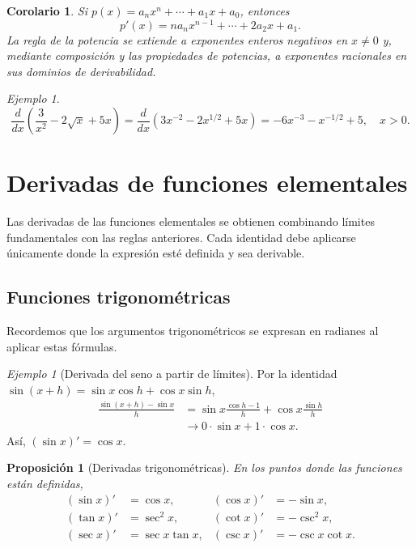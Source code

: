 \documentclass[12pt]{article}
\newtheorem{proposicion}[definicion]{Proposición}
\newtheorem{corolario}[definicion]{Corolario}
\theoremstyle{remark}
\newtheorem{ejemplo}[definicion]{Ejemplo}
\begin{document}
\begin{corolario}
Si $p(x)=a_nx^n+\cdots+a_1x+a_0$, entonces
\[
p'(x)=na_nx^{n-1}+\cdots+2a_2x+a_1.
\]
La regla de la potencia se extiende a exponentes enteros negativos en $x\ne0$ y, mediante composición y las propiedades de potencias, a exponentes racionales en sus dominios de derivabilidad.
\end{corolario}

\begin{ejemplo}
\[
\frac{d}{dx}\left(\frac{3}{x^2}-2\sqrt x+5x\right)
=\frac{d}{dx}(3x^{-2}-2x^{1/2}+5x)
=\boxed{-6x^{-3}-x^{-1/2}+5},\quad x>0.
\]
\end{ejemplo}

\section{Derivadas de funciones elementales}
Las derivadas de las funciones elementales se obtienen combinando límites fundamentales con las reglas anteriores. Cada identidad debe aplicarse únicamente donde la expresión esté definida y sea derivable.

\subsection*{Funciones trigonométricas}
Recordemos que los argumentos trigonométricos se expresan en radianes al aplicar estas fórmulas.

\begin{ejemplo}[Derivada del seno a partir de límites]
Por la identidad $\sin(x+h)=\sin x\cos h+\cos x\sin h$,
\begin{align*}
\frac{\sin(x+h)-\sin x}{h}
&=\sin x\frac{\cos h-1}{h}+\cos x\frac{\sin h}{h}\\
&\longrightarrow 0\cdot\sin x+1\cdot\cos x.
\end{align*}
Así, $\boxed{(\sin x)'=\cos x}$.
\end{ejemplo}

\begin{proposicion}[Derivadas trigonométricas]
En los puntos donde las funciones están definidas,
\begin{align*}
(\sin x)'&=\cos x,&(\cos x)'&=-\sin x,\\
(\tan x)'&=\sec^2x,&(\cot x)'&=-\csc^2x,\\
(\sec x)'&=\sec x\tan x,&(\csc x)'&=-\csc x\cot x.
\end{align*}
\end{proposicion}
\end{document}
